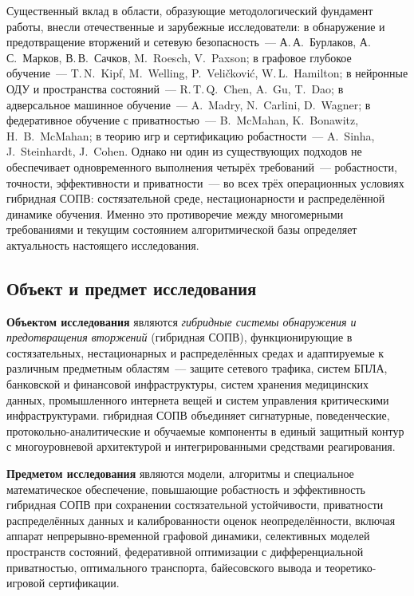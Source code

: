 \documentclass[12pt,a5paper]{article}
\begin{document}
Существенный вклад в области, образующие методологический
фундамент работы, внесли отечественные и зарубежные
исследователи: в обнаружение и предотвращение вторжений и
сетевую безопасность~--- А.\,А.~Бурлаков, А.\,С.~Марков,
В.\,В.~Сачков, M.~Roesch, V.~Paxson; в графовое глубокое
обучение~--- T.\,N.~Kipf, M.~Welling, P.~Veli\v{c}kovi\'{c},
W.\,L.~Hamilton; в нейронные ОДУ и пространства состояний~---
R.\,T.\,Q.~Chen, A.~Gu, T.~Dao; в адверсальное машинное
обучение~--- A.~Madry, N.~Carlini, D.~Wagner; в федеративное
обучение с приватностью~--- B.~McMahan, K.~Bonawitz,
H.~B.~McMahan; в теорию игр и сертификацию робастности~---
A.~Sinha, J.~Steinhardt, J.~Cohen. Однако ни один из
существующих подходов не обеспечивает одновременного выполнения
четырёх требований~--- робастности, точности, эффективности и
приватности~--- во всех трёх операционных условиях
гибридная СОПВ: состязательной среде, нестационарности и
распределённой динамике обучения. Именно это противоречие между
многомерными требованиями и текущим состоянием алгоритмической
базы определяет актуальность настоящего исследования.

\subsection*{Объект и предмет исследования}

\textbf{Объектом исследования} являются \emph{гибридные системы
обнаружения и предотвращения вторжений} (гибридная СОПВ),
функционирующие в состязательных, нестационарных и
распределённых средах и адаптируемые к различным предметным
областям~--- защите сетевого трафика, систем БПЛА, банковской
и финансовой инфраструктуры, систем хранения медицинских данных,
промышленного интернета вещей и систем управления критическими
инфраструктурами. гибридная СОПВ объединяет сигнатурные,
поведенческие, протокольно-аналитические и обучаемые компоненты
в единый защитный контур с многоуровневой архитектурой и
интегрированными средствами реагирования.

\textbf{Предметом исследования} являются модели, алгоритмы и
специальное математическое обеспечение, повышающие робастность
и эффективность гибридная СОПВ при сохранении состязательной
устойчивости, приватности распределённых данных и калиброванности
оценок неопределённости, включая аппарат непрерывно-временной
графовой динамики, селективных моделей пространств состояний,
федеративной оптимизации с дифференциальной приватностью,
оптимального транспорта, байесовского вывода и
теоретико-игровой сертификации.
\end{document}

